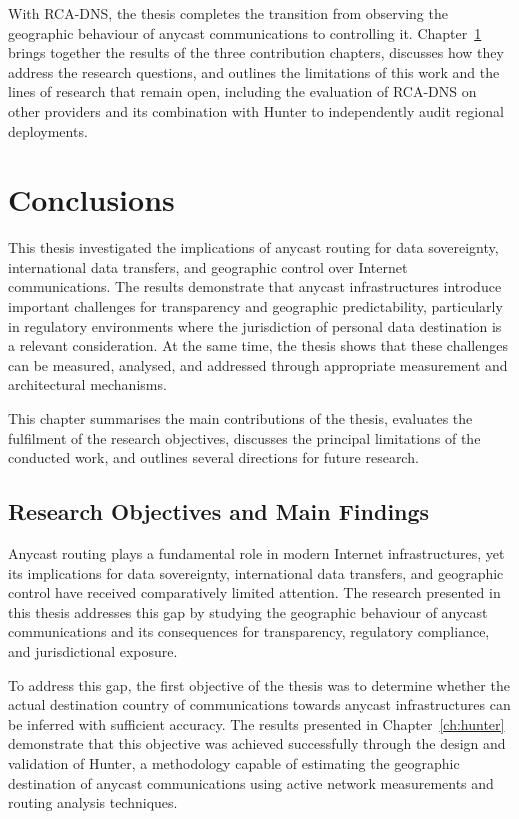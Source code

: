 \documentclass[
A4paper,                %
twoside,                %
openright,              %
chapterprefix=true,     %
12pt,                   %
headings=normal,        %
titlepage=on            %
]{book}
\begin{document}
With RCA-DNS, the thesis completes the transition from observing the geographic behaviour of anycast communications to controlling it. Chapter~\ref{ch:conclusion} brings together the results of the three contribution chapters, discusses how they address the research questions, and outlines the limitations of this work and the lines of research that remain open, including the evaluation of RCA-DNS on other providers and its combination with Hunter to independently audit regional deployments. \newpage 
 \newpage \chapter{Conclusions}
\label{ch:conclusion}

This thesis investigated the implications of anycast routing for data sovereignty, international data transfers, and geographic control over Internet communications. The results demonstrate that anycast infrastructures introduce important challenges for transparency and geographic predictability, particularly in regulatory environments where the jurisdiction of personal data destination is a relevant consideration. At the same time, the thesis shows that these challenges can be measured, analysed, and addressed through appropriate measurement and architectural mechanisms.

This chapter summarises the main contributions of the thesis, evaluates the fulfilment of the research objectives, discusses the principal limitations of the conducted work, and outlines several directions for future research.

\section{Research Objectives and Main Findings}
\label{sc:conclusion_objectives}

Anycast routing plays a fundamental role in modern Internet infrastructures, yet its implications for data sovereignty, international data transfers, and geographic control have received comparatively limited attention. The research presented in this thesis addresses this gap by studying the geographic behaviour of anycast communications and its consequences for transparency, regulatory compliance, and jurisdictional exposure.

To address this gap, the first objective of the thesis was to determine whether the actual destination country of communications towards anycast infrastructures can be inferred with sufficient accuracy. The results presented in Chapter~\ref{ch:hunter} demonstrate that this objective was achieved successfully through the design and validation of Hunter, a methodology capable of estimating the geographic destination of anycast communications using active network measurements and routing analysis techniques.
\end{document}

